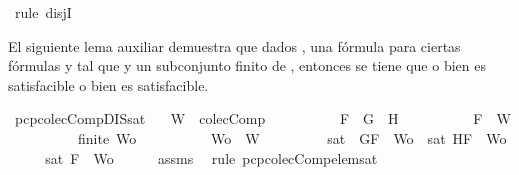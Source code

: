 \begin{isabellebody}
\ {\isacharparenleft}rule\ disjI{}{\isacharparenright}\isanewline
\ \ \isamarkupfalse%
\isanewline
{}\isamarkupfalse%
%
\endisatagproof
{\isafoldproof}%
%
\isadelimproof
%
\endisadelimproof
%
\begin{isamarkuptext}%
El siguiente lema auxiliar demuestra que dados , una fórmula  para ciertas 
  fórmulas  y  tal que  y  un subconjunto finito de , entonces se tiene que o 
  bien  es satisfacible o bien  es satisfacible.%
\end{isamarkuptext}\isamarkuptrue%
\isamarkupfalse%
\ pcp{\isacharunderscore}colecComp{\isacharunderscore}DIS{\isacharunderscore}sat{}{\isacharcolon}\isanewline
\ \ \ {\isachardoublequoteopen}W\ {\isasymin}\ colecComp{\isachardoublequoteclose}\isanewline
\ \ \ \ \ \ \ \ \ \ {\isachardoublequoteopen}F\ {\isacharequal}\ G\ \isactrlbold {\isasymrightarrow}\ H{\isachardoublequoteclose}\isanewline
\ \ \ \ \ \ \ \ \ \ {\isachardoublequoteopen}F\ {\isasymin}\ W{\isachardoublequoteclose}\isanewline
\ \ \ \ \ \ \ \ \ \ {\isachardoublequoteopen}finite\ Wo{\isachardoublequoteclose}\isanewline
\ \ \ \ \ \ \ \ \ \ {\isachardoublequoteopen}Wo\ {\isasymsubseteq}\ W{\isachardoublequoteclose}\isanewline
\ \ \ \ \ \ \ \ \ {\isachardoublequoteopen}sat\ {\isacharparenleft}{\isacharbraceleft}\isactrlbold {\isasymnot}\ G{\isacharcomma}F{\isacharbraceright}\ {\isasymunion}\ Wo{\isacharparenright}\ {\isasymor}\ sat\ {\isacharparenleft}{\isacharbraceleft}H{\isacharcomma}F{\isacharbraceright}\ {\isasymunion}\ Wo{\isacharparenright}{\isachardoublequoteclose}\isanewline
%
\isadelimproof
%
\endisadelimproof
%
\isatagproof
{}\isamarkupfalse%
\ {\isacharminus}\isanewline
\ \ \isamarkupfalse%
\ {\isachardoublequoteopen}sat\ {\isacharparenleft}{\isacharbraceleft}F{\isacharbraceright}\ {\isasymunion}\ Wo{\isacharparenright}{\isachardoublequoteclose}\isanewline
\ \ \ \ \isamarkupfalse%
\ assms{\isacharparenleft}{}{\isacharcomma}{}{\isacharcomma}{}{\isacharcomma}{}{\isacharparenright}\ \isamarkupfalse%
\ {\isacharparenleft}rule\ pcp{\isacharunderscore}colecComp{\isacharunderscore}elem{\isacharunderscore}sat{\isacharparenright}\isanewline

\end{isabellebody}
